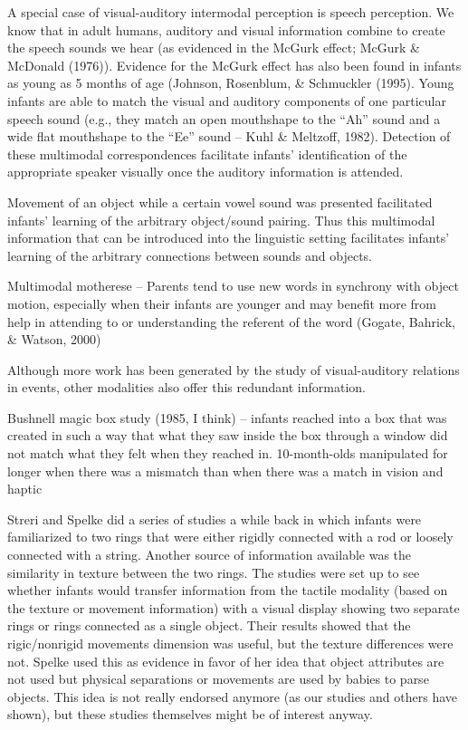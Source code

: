 A special case of visual-auditory intermodal perception is speech
perception.  We know that in adult humans, auditory and visual
information combine to create the speech sounds we hear (as evidenced
in the McGurk effect; McGurk \& McDonald (1976)).  Evidence for the
McGurk effect has also been found in infants as young as 5 months of
age (Johnson, Rosenblum, \& Schmuckler (1995).  Young infants are able
to match the visual and auditory components of one particular speech
sound (e.g., they match an open mouthshape to the ``Ah'' sound and a
wide flat mouthshape to the ``Ee'' sound -- Kuhl \& Meltzoff, 1982).
Detection of these multimodal correspondences facilitate infants'
identification of the appropriate speaker visually once the auditory
information is attended.

Movement of an object while a certain vowel sound was presented
facilitated infants' learning of the arbitrary object/sound pairing.
Thus this multimodal information that can be introduced into the
linguistic setting facilitates infants' learning of the arbitrary
connections between sounds and objects.

Multimodal motherese -- Parents tend to use new words in synchrony
with object motion, especially when their infants are younger and may
benefit more from help in attending to or understanding the referent
of the word (Gogate, Bahrick, \& Watson, 2000)



Although more work has been generated by the study of visual-auditory
relations in events, other modalities also offer this redundant
information.

Bushnell magic box study (1985, I think) -- infants reached into a box
that was created in such a way that what they saw inside the box
through a window did not match what they felt when they reached in.
10-month-olds manipulated for longer when there was a mismatch than
when there was a match in vision and haptic



Streri and Spelke did a series of studies a while back in which
infants were familiarized to two rings that were either rigidly
connected with a rod or loosely connected with a string.  Another
source of information available was the similarity in texture between
the two rings.  The studies were set up to see whether infants would
transfer information from the tactile modality (based on the texture
or movement information) with a visual display showing two separate
rings or rings connected as a single object.  Their results showed
that the rigic/nonrigid movements dimension was useful, but the
texture differences were not. Spelke used this as evidence in favor of
her idea that object attributes are not used but physical separations
or movements are used by babies to parse objects.  This idea is not
really endorsed anymore (as our studies and others have shown), but
these studies themselves might be of interest anyway.



